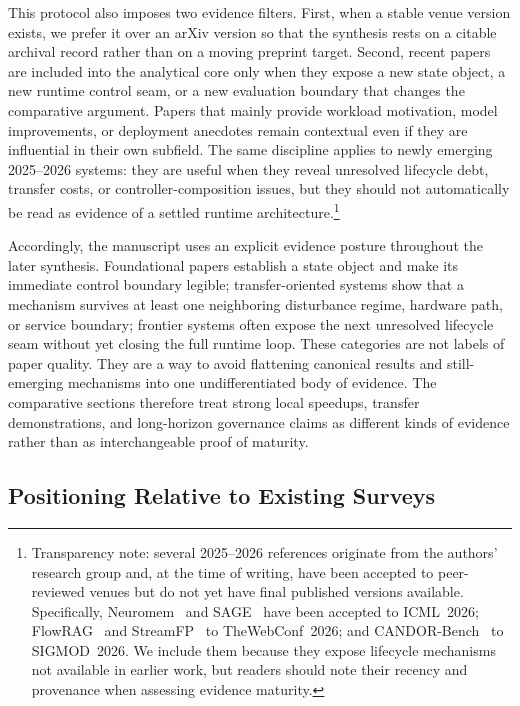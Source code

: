 \documentclass[acmsmall,screen,review]{acmart}
\begin{document}
This protocol also imposes two evidence filters. First, when a stable venue version exists, we prefer it over an arXiv version so that the synthesis rests on a citable archival record rather than on a moving preprint target. Second, recent papers are included into the analytical core only when they expose a new state object, a new runtime control seam, or a new evaluation boundary that changes the comparative argument. Papers that mainly provide workload motivation, model improvements, or deployment anecdotes remain contextual even if they are influential in their own subfield. The same discipline applies to newly emerging 2025--2026 systems: they are useful when they reveal unresolved lifecycle debt, transfer costs, or controller-composition issues, but they should not automatically be read as evidence of a settled runtime architecture.\footnote{Transparency note: several 2025--2026 references originate from the authors' research group and, at the time of writing, have been accepted to peer-reviewed venues but do not yet have final published versions available. Specifically, Neuromem~\cite{zhang2026neuromem} and SAGE~\cite{liu2026sage} have been accepted to ICML~2026; FlowRAG~\cite{zhang2026flowrag} and StreamFP~\cite{li2026streamfp} to TheWebConf~2026; and CANDOR-Bench~\cite{wang2026candor} to SIGMOD~2026. We include them because they expose lifecycle mechanisms not available in earlier work, but readers should note their recency and provenance when assessing evidence maturity.}

Accordingly, the manuscript uses an explicit evidence posture throughout the later synthesis. Foundational papers establish a state object and make its immediate control boundary legible; transfer-oriented systems show that a mechanism survives at least one neighboring disturbance regime, hardware path, or service boundary; frontier systems often expose the next unresolved lifecycle seam without yet closing the full runtime loop. These categories are not labels of paper quality. They are a way to avoid flattening canonical results and still-emerging mechanisms into one undifferentiated body of evidence. The comparative sections therefore treat strong local speedups, transfer demonstrations, and long-horizon governance claims as different kinds of evidence rather than as interchangeable proof of maturity.

\subsection{Positioning Relative to Existing Surveys}
\end{document}

